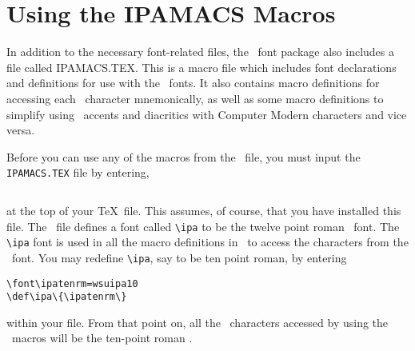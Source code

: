 \vbox{}

\vbox{}

\vbox{}

\vbox{}

\vbox{}

\vbox{}

\vbox{}

\vbox{}

\vbox{}

\newpage
\flushbottom
\section{Using the IPAMACS Macros}

In addition to the necessary font-related files, the \wsu\  font package
also includes a file called IPAMACS.TEX. This is a macro file which includes
font declarations and definitions for use with the \wsu\  fonts.
It also contains macro definitions for accessing each \wsu\  character
mnemonically, as well as some macro definitions
to simplify using \wsu\  accents and diacritics with Computer Modern
characters and vice versa.

Before you can use any of the macros from the \ipam\ file, you must input the
{\tt IPAMACS.TEX} file by entering,
\begin{verbatim}

\end{verbatim}

\noindent at the top of your \TeX\ file. This assumes, of course, that you have
installed this file.
The \ipam\ file defines a font called
\verb?\ipa? to be the twelve point roman \wsu\
font. The \verb?\ipa? font is used in all the macro definitions in \ipam\
to access the
characters from the \wsu\ font. You may redefine \verb?\ipa?, say to be ten point
roman, by entering
\begin{verbatim}
\font\ipatenrm=wsuipa10
\def\ipa\{\ipatenrm\}
\end{verbatim}
\noindent within your file. From that point on, all the \wsu\ characters
 accessed by
using the \ipam\ macros will be the ten-point roman \wsu.

